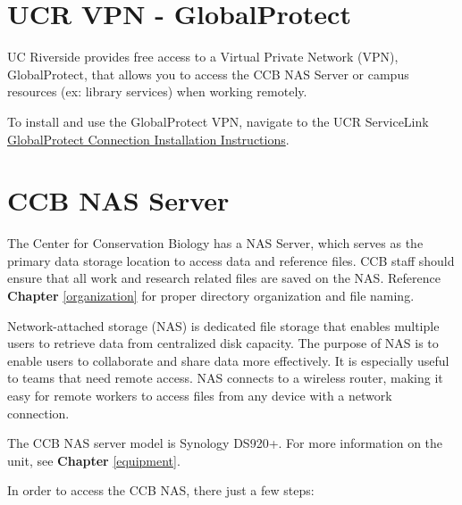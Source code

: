 \documentclass[
]{book}
\begin{document}
\hypertarget{ucr-vpn---globalprotect}{%
\section{UCR VPN - GlobalProtect}\label{ucr-vpn---globalprotect}}

UC Riverside provides free access to a Virtual Private Network (VPN), GlobalProtect, that allows you to access the CCB NAS Server or campus resources (ex: library services) when working remotely.

To install and use the GlobalProtect VPN, navigate to the UCR ServiceLink \href{https://ucrsupport.service-now.com/ucr_portal/?id=kb_article\&sys_id=8a264d791b5f0c149c0b844fdd4bcb34}{GlobalProtect Connection Installation Instructions}.

\hypertarget{ccb-nas-server}{%
\section{CCB NAS Server}\label{ccb-nas-server}}

The Center for Conservation Biology has a NAS Server, which serves as the primary data storage location to access data and reference files. CCB staff should ensure that all work and research related files are saved on the NAS. Reference \textbf{Chapter} \ref{organization} for proper directory organization and file naming.

Network-attached storage (NAS) is dedicated file storage that enables multiple users to retrieve data from centralized disk capacity. The purpose of NAS is to enable users to collaborate and share data more effectively. It is especially useful to teams that need remote access. NAS connects to a wireless router, making it easy for remote workers to access files from any device with a network connection.

The CCB NAS server model is Synology DS920+. For more information on the unit, see \textbf{Chapter} \ref{equipment}.

In order to access the CCB NAS, there just a few steps:
\end{document}
